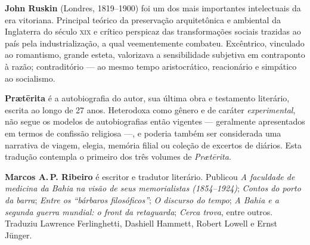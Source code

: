 \textbf{John Ruskin} (Londres, 1819--1900) foi um dos mais importantes intelectuais da era vitoriana. Principal teórico da preservação arquitetônica e ambiental da Inglaterra do século \textsc{xix} e crítico perspicaz das transformações sociais trazidas ao país pela industrialização, a qual veementemente combateu. Excêntrico, vinculado ao romantismo, grande esteta, valorizava a sensibilidade subjetiva em contraponto à razão; contraditório --- ao mesmo tempo aristocrático, reacionário e simpático ao socialismo.

\textbf{Pr\ae tērita} é a autobiografia do autor, sua última obra e testamento literário, escrita ao longo de 27 anos. Heterodoxa como gênero e de caráter \textit{experimental}, não segue os modelos de autobiografias então vigentes --- geralmente apresentados em termos de confissão religiosa ---, e poderia também ser considerada uma narrativa de viagem, elegia, memória filial ou coleção de excertos de diários. Esta tradução contempla o primeiro dos três volumes de \textit{Pr\ae tērita}.

\textbf{Marcos A.\,P. Ribeiro} é escritor e tradutor literário. Publicou \textit{A faculdade de medicina da Bahia na visão de seus memorialistas (1854--1924)}; \textit{Contos do porto da barra}; \textit{Entre os “bárbaros filosóficos”}; \textit{O discurso do tempo}; \textit{A Bahia e a segunda guerra mundial: o front da retaguarda}; \textit{Cerca trova}, entre outros. Traduziu Lawrence Ferlinghetti, Dashiell Hammett, Robert Lowell e Ernst Jünger. 






